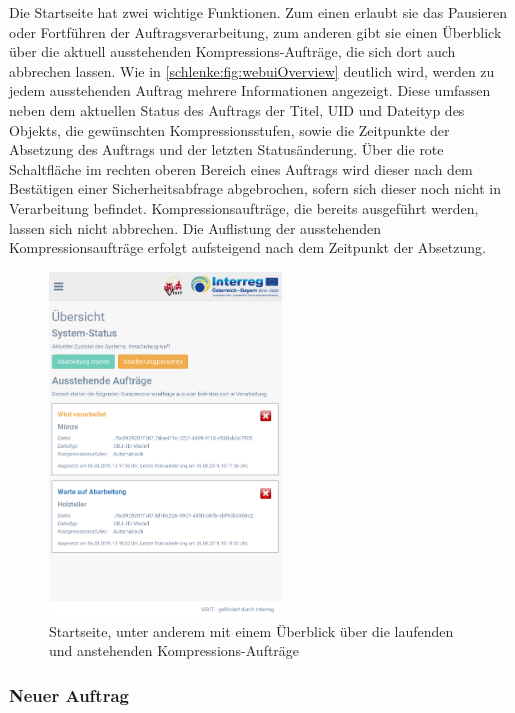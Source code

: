 Die Startseite hat zwei wichtige Funktionen. Zum einen erlaubt sie das Pausieren oder Fortführen der Auftragsverarbeitung, zum anderen gibt sie einen Überblick über die aktuell ausstehenden Kompressions-Aufträge, die sich dort auch abbrechen lassen. Wie in \autoref{schlenke:fig:webuiOverview} deutlich wird, werden zu jedem ausstehenden Auftrag mehrere Informationen angezeigt. Diese umfassen neben dem aktuellen Status des Auftrags der Titel, UID und Dateityp des Objekts, die gewünschten Kompressionsstufen, sowie die Zeitpunkte der Absetzung des Auftrags und der letzten Statusänderung. Über die rote Schaltfläche im rechten oberen Bereich eines Auftrags wird dieser nach dem Bestätigen einer Sicherheitsabfrage abgebrochen, sofern sich dieser noch nicht in Verarbeitung befindet. Kompressionsaufträge, die bereits ausgeführt werden, lassen sich nicht abbrechen. Die Auflistung der ausstehenden Kompressionsaufträge erfolgt aufsteigend nach dem Zeitpunkt der Absetzung.

\begin{figure}
\begin{center}
\includegraphics[width=0.55\textwidth]{Figures/schlenker/webui/overview.png}
\caption{Startseite, unter anderem mit einem Überblick über die laufenden und anstehenden Kompressions-Aufträge}
\label{schlenke:fig:webuiOverview}
\end{center}
\end{figure}

\subsubsection{Neuer Auftrag}


